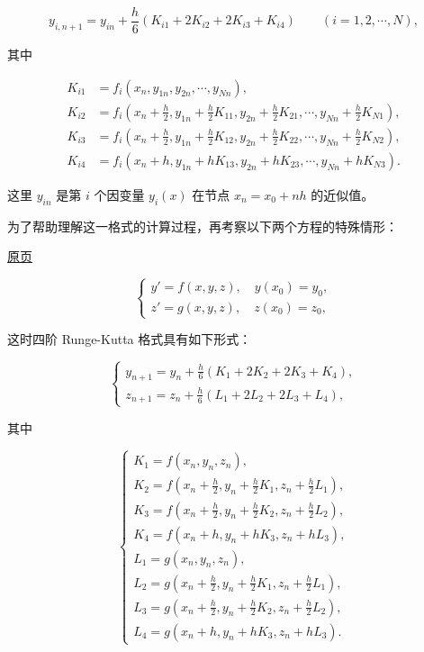 \documentclass[
  10pt,
  fontset=fandol]{ctexart}
\begin{document}
\[
y_{i,n+1}=y_{in}+\frac h6(K_{i1}+2K_{i2}+2K_{i3}+K_{i4})\qquad(i=1,2,\cdots,N),
\]

其中

\[
\begin{aligned}
K_{i1}&=f_i(x_n,y_{1n},y_{2n},\cdots,y_{Nn}),\\
K_{i2}&=f_i\left(x_n+\frac h2,y_{1n}+\frac h2K_{11},y_{2n}+\frac h2K_{21},\cdots,y_{Nn}+\frac h2K_{N1}\right),\\
K_{i3}&=f_i\left(x_n+\frac h2,y_{1n}+\frac h2K_{12},y_{2n}+\frac h2K_{22},\cdots,y_{Nn}+\frac h2K_{N2}\right),\\
K_{i4}&=f_i(x_n+h,y_{1n}+hK_{13},y_{2n}+hK_{23},\cdots,y_{Nn}+hK_{N3}).
\end{aligned}
\]

这里 \(y_{in}\) 是第 \(i\) 个因变量 \(y_i(x)\) 在节点 \(x_n=x_0+nh\) 的近似值。

为了帮助理解这一格式的计算过程，再考察以下两个方程的特殊情形：

\href{../../source-images/pdf-146.jpeg}{原页}

\[
\begin{cases}
y'=f(x,y,z),\quad y(x_0)=y_0,\\
z'=g(x,y,z),\quad z(x_0)=z_0,
\end{cases}
\]

这时四阶 Runge-Kutta 格式具有如下形式：

\[
\begin{cases}
\displaystyle y_{n+1}=y_n+\frac h6(K_1+2K_2+2K_3+K_4),\\[6pt]
\displaystyle z_{n+1}=z_n+\frac h6(L_1+2L_2+2L_3+L_4),
\end{cases}
\tag{5.6.1}
\]

其中

\[
\begin{cases}
K_1=f(x_n,y_n,z_n),\\
\displaystyle K_2=f\left(x_n+\frac h2,y_n+\frac h2K_1,z_n+\frac h2L_1\right),\\[4pt]
\displaystyle K_3=f\left(x_n+\frac h2,y_n+\frac h2K_2,z_n+\frac h2L_2\right),\\[4pt]
K_4=f(x_n+h,y_n+hK_3,z_n+hL_3),\\
L_1=g(x_n,y_n,z_n),\\
\displaystyle L_2=g\left(x_n+\frac h2,y_n+\frac h2K_1,z_n+\frac h2L_1\right),\\[4pt]
\displaystyle L_3=g\left(x_n+\frac h2,y_n+\frac h2K_2,z_n+\frac h2L_2\right),\\[4pt]
L_4=g(x_n+h,y_n+hK_3,z_n+hL_3).
\end{cases}
\tag{5.6.2}
\]
\end{document}
